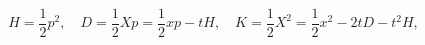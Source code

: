 \begin{equation}
H=\frac{1}{2}p^2,\quad
D=\frac{1}{2}Xp=\frac{1}{2}xp-tH,\quad
K=\frac{1}{2}X^2=\frac{1}{2}x^2-2tD-t^2H,
\label{2even}
\end{equation}

